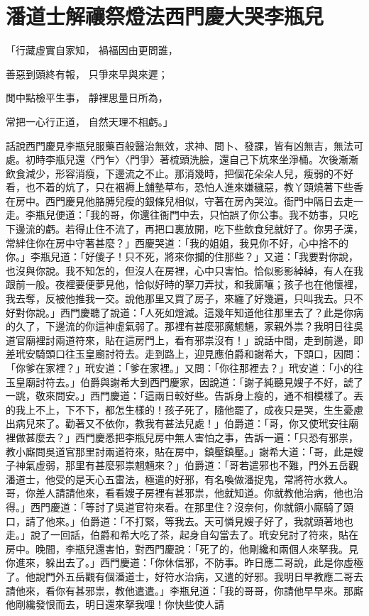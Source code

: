 %

\chapter{潘道士解禳祭燈法\KG 西門慶大哭李瓶兒}

「行藏虛實自家知，  禍福因由更問誰，

善惡到頭終有報，  只爭來早與來遲；

閒中點檢平生事，  靜裡思量日所為，

常把一心行正道，  自然天理不相虧。」

話說西門慶見李瓶兒服藥百般醫治無效，求神、問卜、發課，皆有凶無吉，無法可處。初時李瓶兒還〈門乍〉〈門爭〉著梳頭洗臉，還自己下炕來坐淨桶。次後漸漸飲食減少，形容消瘦，下邊流之不止。那消幾時，把個花朵朵人兒，瘦弱的不好看，也不着的炕了，只在裀褥上舖墊草布，恐怕人進來嫌穢惡，教丫頭燒著下些香在房中。西門慶見他胳膊兒瘦的銀條兒相似，守著在房內哭泣。衙門中隔日去走一走。李瓶兒便道：「我的哥，你還往衙門中去，只怕誤了你公事。我不妨事，只吃下邊流的虧。若得止住不流了，再把口裏放開，吃下些飲食兒就好了。你男子漢，常絆住你在房中守著甚麼？」西慶哭道：「我的姐姐，我見你不好，心中捨不的你。」李瓶兒道：「好傻子！只不死，將來你攔的住那些？」又道：「我要對你說，也沒與你說。我不知怎的，但沒人在房裡，心中只害怕。恰似影影綽綽，有人在我跟前一般。夜裡要便夢見他，恰似好時的拏刀弄扙，和我廝嚷；孩子也在他懷裡，我去奪，反被他推我一交。說他那里又買了房子，來纏了好幾遍，只叫我去。只不好對你說。」西門慶聽了說道：「人死如燈滅。這幾年知道他往那里去了？此是你病的久了，下邊流的你這神虛氣弱了。那裡有甚麼邪魔魍魎，家親外祟？我明日往吳道官廟裡討兩道符來，貼在這房門上，看有邪祟沒有！」說話中間，走到前邊，即差玳安騎頭口往玉皇廟討符去。走到路上，迎見應伯爵和謝希大，下頭口，因問：「你爹在家裡？」玳安道：「爹在家裡。」又問：「你往那裡去？」玳安道：「小的往玉皇廟討符去。」伯爵與謝希大到西門慶家，因說道：「謝子純聽見嫂子不好，諕了一跳，敬來問安。」西門慶道：「這兩日較好些。告訴身上瘦的，通不相模樣了。丟的我上不上，下不下，都怎生樣的！孩子死了，隨他罷了，成夜只是哭，生生憂慮出病兒來了。勸著又不依你，教我有甚法兒處！」伯爵道：「哥，你又使玳安往廟裡做甚麼去？」西門慶悉把李瓶兒房中無人害怕之事，告訴一遍：「只恐有邪祟，教小廝問吳道官那里討兩道符來，貼在房中，鎮壓鎮壓。」謝希大道：「哥，此是嫂子神氣虛弱，那里有甚麼邪祟魍魎來？」伯爵道：「哥若遣邪也不難，門外五岳觀潘道士，他受的是天心五雷法，極遣的好邪，有名喚做潘捉鬼，常將符水救人。哥，你差人請請他來，看看嫂子房裡有甚邪祟，他就知道。你就教他治病，他也治得。」西門慶道：「等討了吳道官符來看。在那里住？沒奈何，你就領小廝騎了頭口，請了他來。」伯爵道：「不打緊，等我去。天可憐見嫂子好了，我就頭著地也走。」說了一回話，伯爵和希大吃了茶，起身自勾當去了。玳安兒討了符來，貼在房中。晚間，李瓶兒還害怕，對西門慶說：「死了的，他剛纔和兩個人來拏我。見你進來，躲出去了。」西門慶道：「你休信邪，不防事。昨日應二哥說，此是你虛極了。他說門外五岳觀有個潘道士，好符水治病，又遣的好邪。我明日早教應二哥去請他來，看你有甚邪祟，教他遣遣。」李瓶兒道：「我的哥哥，你請他早早來。那廝他剛纔發恨而去，明日還來拏我哩！你快些使人請